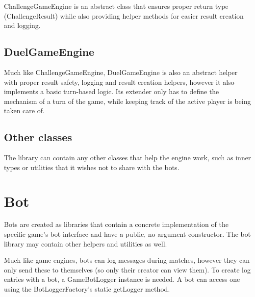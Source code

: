 		ChallengeGameEngine is an abstract class that ensures proper return type (ChallengeResult) while also providing helper methods for easier result creation and logging.
		
		\subsection{DuelGameEngine}
		
		Much like ChallengeGameEngine, DuelGameEngine is also an abstract helper with proper result safety, logging and result creation helpers, however it also implements a basic turn-based logic. Its extender only has to define the mechanism of a turn of the game, while keeping track of the active player is being taken care of.
		
		\subsection{Other classes}
		
		The library can contain any other classes that help the engine work, such as inner types or utilities that it wishes not to share with the bots.

	\section{Bot}
	
	Bots are created as libraries that contain a concrete implementation of the specific game's bot interface and have a public, no-argument constructor. The bot library may contain other helpers and utilities as well.

	Much like game engines, bots can log messages during matches, however they can only send these to themselves (so only their creator can view them). To create log entries with a bot, a GameBotLogger instance is needed. A bot can access one using the BotLoggerFactory's static getLogger method.

%






